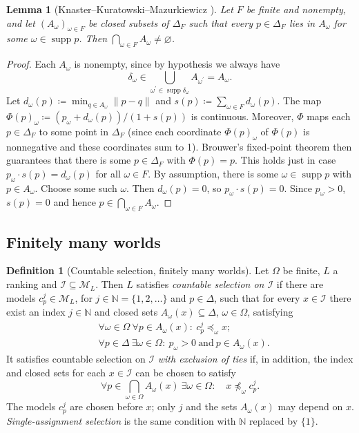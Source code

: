 \documentclass[11pt]{article}
\newtheorem{lemma}[theorem]{Lemma}
\theoremstyle{definition}
\newtheorem{definition}[theorem]{Definition}
\theoremstyle{remark}
\newcommand{\M}{\mathcal M}
\newcommand{\I}{\mathcal I}
\newcommand{\supp}{\operatorname{supp}}
\begin{document}
\begin{lemma}[Knaster--Kuratowski--Mazurkiewicz {\cite{KKM1929}}]\label{lem:kkm}
Let $F$ be finite and nonempty, and let $(A_\omega)_{\omega\in F}$ be closed subsets of $\Delta_F$ such that every $p\in\Delta_F$ lies in $A_\omega$ for some $\omega\in\supp p$. Then $\bigcap_{\omega\in F}A_\omega\ne\varnothing$.
\end{lemma}
\begin{proof}
Each $A_\omega$ is nonempty, since by hypothesis we always have
\[
\delta_\omega\in\bigcup_{\omega^\prime\in\supp \delta_\omega}A_{\omega^\prime}=A_\omega.
\]
Let $d_\omega(p)\coloneqq\min_{q\in A_\omega}\lVert p-q \rVert$ and $s(p)\coloneqq\sum_{\omega\in F} d_\omega(p)$. The map $\Phi(p)_\omega\coloneqq(p_\omega+d_\omega(p))/(1+s(p))$ is continuous. Moreover, $\Phi$ maps each $p\in\Delta_F$ to some point in $\Delta_F$ (since each coordinate $\Phi(p)_\omega$ of $\Phi(p)$ is nonnegative and these coordinates sum to 1). Brouwer's fixed-point theorem then guarantees that there is some $p\in\Delta_F$ with $\Phi(p)=p$. This holds just in case $p_\omega\cdot s(p)=d_\omega(p)$ for all $\omega\in F$. By assumption, there is some $\omega\in\supp p$ with $p\in A_\omega$. Choose some such $\omega$. Then $d_\omega(p)=0$, so $p_\omega\cdot s(p)=0$. Since $p_\omega>0$, $s(p)=0$ and hence $p\in\bigcap_{\omega\in F}A_\omega$.
\end{proof}

\subsection{Finitely many worlds}

\begingroup\color{red}
\begin{definition}[Countable selection, finitely many worlds]\label{def:selection-finite}
Let $\Omega$ be finite, $L$ a ranking and $\I\subseteq\M_L$. Then $L$ satisfies \emph{countable selection on $\I$} if there are models $c^j_p\in\M_L$, for $j\in\mathbb N=\{1,2,\ldots\}$ and $p\in\Delta$, such that for every $x\in\I$ there exist an index $j\in\mathbb N$ and closed sets $A_\omega(x)\subseteq\Delta$, $\omega\in\Omega$, satisfying
\begin{align}
&\forall\omega\in\Omega\ \forall p\in A_\omega(x):\ c^j_p\preceq_\omega x;\tag{F1}\label{eq:f-comparison}\\
&\forall p\in\Delta\ \exists\omega\in\Omega:\ p_\omega>0\ \text{and}\ p\in A_\omega(x).\tag{F2}\label{eq:f-support}
\end{align}
It satisfies countable selection on $\I$ \emph{with exclusion of ties} if, in addition, the index and closed sets for each $x\in\I$ can be chosen to satisfy
\[
\forall p\in\bigcap_{\omega\in\Omega}A_\omega(x)\ \exists\omega\in\Omega:\quad x\not\preceq_\omega c^j_p.\tag{F3}\label{eq:f-notie}
\]
The models $c^j_p$ are chosen before $x$; only $j$ and the sets $A_\omega(x)$ may depend on $x$. \emph{Single-assignment selection} is the same condition with $\mathbb N$ replaced by $\{1\}$.
\end{definition}
\end{document}
